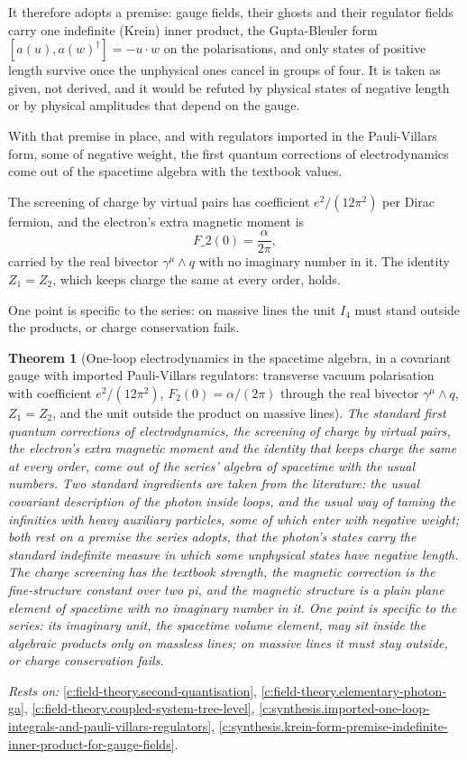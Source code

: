 \documentclass[11pt]{article}
\newtheorem{theorem}{Theorem}[section]
\theoremstyle{definition}
\theoremstyle{plain}
\begin{document}
It therefore adopts a premise: gauge fields, their ghosts and their regulator fields carry one indefinite (Krein) inner product, the Gupta-Bleuler form $[a(u), a(w)^{\dagger}] = -u\cdot w$ on the polarisations, and only states of positive length survive once the unphysical ones cancel in groups of four. It is taken as given, not derived, and it would be refuted by physical states of negative length or by physical amplitudes that depend on the gauge.

With that premise in place, and with regulators imported in the Pauli-Villars form, some of negative weight, the first quantum corrections of electrodynamics come out of the spacetime algebra with the textbook values.

The screening of charge by virtual pairs has coefficient $e^{2}/(12\pi^{2})$ per Dirac fermion, and the electron's extra magnetic moment is \[ F\_{2}(0) = \frac{\alpha}{2\pi} , \] carried by the real bivector $\gamma^{\mu} \wedge q$ with no imaginary number in it. The identity $Z_{1} = Z_{2}$, which keeps charge the same at every order, holds.

One point is specific to the series: on massive lines the unit $I_4$ must stand outside the products, or charge conservation fails.

\begin{theorem}[One-loop electrodynamics in the spacetime algebra, in a covariant gauge with imported Pauli-Villars regulators: transverse vacuum polarisation with coefficient $e^{2}/(12\pi^{2})$, $F_{2}(0) = \alpha/(2\pi)$ through the real bivector $\gamma^{\mu} \wedge q$, $Z_{1} = Z_{2}$, and the unit outside the product on massive lines]\label{c:synthesis.one-loop-qed-in-the-spacetime-algebra}
The standard first quantum corrections of electrodynamics, the screening of charge by virtual pairs, the electron's extra magnetic moment and the identity that keeps charge the same at every order, come out of the series' algebra of spacetime with the usual numbers. Two standard ingredients are taken from the literature: the usual covariant description of the photon inside loops, and the usual way of taming the infinities with heavy auxiliary particles, some of which enter with negative weight; both rest on a premise the series adopts, that the photon's states carry the standard indefinite measure in which some unphysical states have negative length. The charge screening has the textbook strength, the magnetic correction is the fine-structure constant over two pi, and the magnetic structure is a plain plane element of spacetime with no imaginary number in it. One point is specific to the series: its imaginary unit, the spacetime volume element, may sit inside the algebraic products only on massless lines; on massive lines it must stay outside, or charge conservation fails.
\end{theorem}
\noindent\emph{Rests on:} \ref{c:field-theory.second-quantisation}, \ref{c:field-theory.elementary-photon-ga}, \ref{c:field-theory.coupled-system-tree-level}, \ref{c:synthesis.imported-one-loop-integrals-and-pauli-villars-regulators}, \ref{c:synthesis.krein-form-premise-indefinite-inner-product-for-gauge-fields}.
\end{document}
